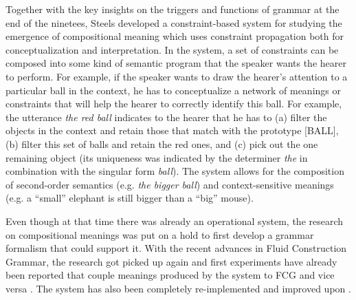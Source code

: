 Together with the key insights on the triggers and functions of grammar at the end of the ninetees, Steels developed a constraint-based system for studying the emergence of compositional meaning \citep{steels00emergence} which uses constraint propagation both for conceptualization and interpretation. In the system, a set of constraints can be composed into some kind of semantic program that the speaker wants the hearer to perform. For example, if the speaker wants to draw the hearer's attention to a particular ball in the context, he has to conceptualize a network of meanings or constraints that will help the hearer to correctly identify this ball. For example, the utterance {\em the red ball} indicates to the hearer that he has to (a) filter the objects in the context and retain those that match with the prototype [BALL], (b) filter this set of balls and retain the red ones, and (c) pick out the one remaining object (its uniqueness was indicated by the determiner {\em the} in combination with the singular form {\em ball}). The system allows for the composition of second-order semantics (e.g. {\em the bigger ball}) and context-sensitive meanings (e.g. a ``small'' elephant is still bigger than a ``big'' mouse).

Even though at that time there was already an operational system, the research on compositional meanings was put on a hold to first develop a grammar formalism that could support it. With the recent advances in Fluid Construction Grammar, the research got picked up again and first experiments have already been reported that couple meanings produced by the system to FCG and vice versa \citep{bleys08recursive, steels05planning}. The system has also been completely re-implemented and improved upon \citep[see][for an introduction]{vandenbroeck07constraint, vandenbroeck08constraint}.